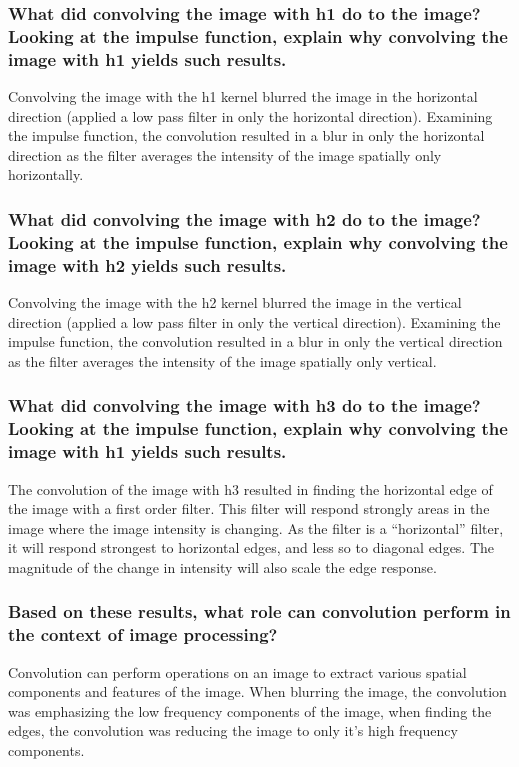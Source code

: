 \documentclass[article, 1.5space, letterpaper, 12pt, oneside, header, footer]{SydeClass}
\begin{document}
\subsubsection{What did convolving the image with h1 do to the image? Looking at the impulse function, explain why convolving the image with h1 yields such results.}

Convolving the image with the h1 kernel blurred the image in the horizontal direction (applied a low pass filter in only the horizontal direction). Examining the impulse function, the convolution resulted in a blur in only the horizontal direction as the filter averages the intensity of the image spatially only horizontally. 

\subsubsection{What did convolving the image with h2 do to the image? Looking at the impulse function, explain why convolving the image with h2 yields such results.}

Convolving the image with the h2 kernel blurred the image in the vertical direction (applied a low pass filter in only the vertical direction). Examining the impulse function, the convolution resulted in a blur in only the vertical direction as the filter averages the intensity of the image spatially only vertical. 


\subsubsection{What did convolving the image with h3 do to the image? Looking at the impulse function, explain why convolving the image with h1 yields such results.}

The convolution of the image with h3 resulted in finding the horizontal edge of the image with a first order filter. This filter will respond strongly areas in the image where the image intensity is changing. As the filter is a ``horizontal'' filter, it will respond strongest to horizontal edges, and less so to diagonal edges. The magnitude of the change in intensity will also scale the edge response.

\subsubsection{Based on these results, what role can convolution perform in the context of image processing?}

Convolution can perform operations on an image to extract various spatial components and features of the image. When blurring the image, the convolution was emphasizing the low frequency components of the image, when finding the edges, the convolution was reducing the image to only it's high frequency components.
\end{document}
